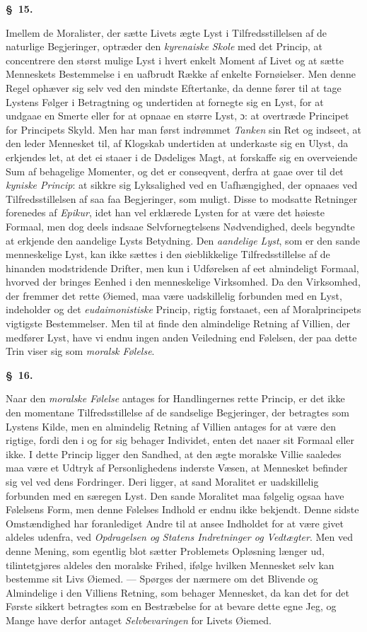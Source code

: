 \documentclass[12pt]{article}
\newcommand{\opage}[1]{\marginnote{\footnotesize\textit{[#1]}}}
\newcommand{\slaw}[1]{\par\medskip\begin{center}\textbf{\S~#1.}\end{center}\nopagebreak}
\begin{document}
\slaw{15}
Imellem de Moralister, der sætte Livets ægte Lyst i Tilfreds\opage{148}stillelsen af de naturlige Begjeringer, optræder den \emph{kyrenaiske Skole} med det Princip, at concentrere den størst mulige Lyst i hvert enkelt Moment af Livet og at sætte Menneskets Bestemmelse i en uafbrudt Række af enkelte Fornøielser. Men denne Regel ophæver sig selv ved den mindste Eftertanke, da denne fører til at tage Lystens Følger i Betragtning og undertiden at fornegte sig en Lyst, for at undgaae en Smerte eller for at opnaae en større Lyst, ɔ: at overtræde Principet for Principets Skyld. Men har man først indrømmet \emph{Tanken} sin Ret og indseet, at den leder Mennesket til, af Klogskab undertiden at underkaste sig en Ulyst, da erkjendes let, at det ei staaer i de Dødeliges Magt, at forskaffe sig en overveiende Sum af behagelige Momenter, og det er conseqvent, derfra at gaae over til det \emph{kyniske Princip}: at sikkre sig Lyksalighed ved en Uafhængighed, der opnaaes ved Tilfredsstillelsen af saa faa Begjeringer, som muligt. Disse to modsatte Retninger forenedes af \emph{Epikur}, idet han vel erklærede Lysten for at være det høieste Formaal, men dog deels indsaae Selvfornegtelsens Nødvendighed, deels begyndte at erkjende den aandelige Lysts Betydning. Den \emph{aandelige Lyst}, som er den sande menneskelige Lyst, kan ikke sættes i den øieblikkelige Tilfredsstillelse af de hinanden modstridende Drifter, men kun i Udførelsen af eet almindeligt Formaal, hvorved der bringes Eenhed i den menneskelige Virksomhed. Da den Virksomhed, der fremmer det rette Øiemed, maa være uadskillelig forbunden med en Lyst, indeholder og det \emph{eudaimonistiske} Princip, rigtig forstaaet, een af Moralprincipets vigtigste Bestemmelser. Men til at finde den almindelige Retning af Villien, der medfører Lyst, have vi endnu ingen anden Veiledning end Følelsen, der paa dette Trin viser sig som \emph{moralsk Følelse}.

\slaw{16}
Naar den \emph{moralske Følelse} antages for Handlingernes rette Princip, er det ikke den momentane Tilfredsstillelse af de \opage{149}sandselige Begjeringer, der betragtes som Lystens Kilde, men en almindelig Retning af Villien antages for at være den rigtige, fordi den i og for sig behager Individet, enten det naaer sit Formaal eller ikke. I dette Princip ligger den Sandhed, at den ægte moralske Villie saaledes maa være et Udtryk af Personlighedens inderste Væsen, at Mennesket befinder sig vel ved dens Fordringer. Deri ligger, at sand Moralitet er uadskillelig forbunden med en særegen Lyst. Den sande Moralitet maa følgelig ogsaa have Følelsens Form, men denne Følelses Indhold er endnu ikke bekjendt. Denne sidste Omstændighed har foranlediget Andre til at ansee Indholdet for at være givet aldeles udenfra, ved \emph{Opdragelsen og Statens Indretninger og Vedtægter}. Men ved denne Mening, som egentlig blot sætter Problemets Opløsning længer ud, tilintetgjøres aldeles den moralske Frihed, ifølge hvilken Mennesket selv kan bestemme sit Livs Øiemed. --- Spørges der nærmere om det Blivende og Almindelige i den Villiens Retning, som behager Mennesket, da kan det for det Første sikkert betragtes som en Bestræbelse for at bevare dette egne Jeg, og Mange have derfor antaget \emph{Selvbevaringen} for Livets Øiemed.
\end{document}
